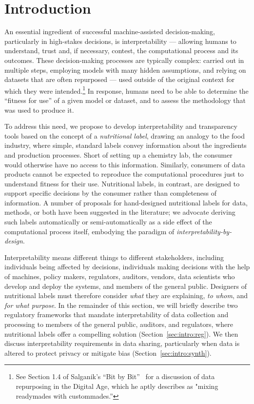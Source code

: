 \section{Introduction}
\label{seC:intro}

An essential ingredient of successful machine-assisted decision-making, particularly in high-stakes decisions, is interpretability --– allowing humans to understand, trust and, if necessary, contest, the computational process and its outcomes.   These decision-making processes are typically complex:  carried out in multiple steps, employing models with many hidden assumptions, and relying on datasets that are often repurposed --- used outside of the original context for which they were intended.\footnote{See Section 1.4 of Salganik's ``Bit by Bit''~\cite{salganik} for a discussion of data repurposing in the Digital Age, which he aptly describes as "mixing readymades with custommades.''}  In response, humans need to be able to determine the ``fitness for use'' of a given model or dataset, and to assess the methodology that was used to produce it.  

To address this need, we propose to develop interpretability and transparency tools based on the concept of a {\em nutritional label}, drawing an analogy to the food industry, where simple, standard labels convey information about the ingredients and production processes. Short of setting up a chemistry lab, the consumer would otherwise have no access to this information. Similarly, consumers of data products cannot be expected to reproduce the computational procedures just to understand fitness for their use.   Nutritional labels, in contrast, are designed to support specific decisions by the consumer rather than completeness of information.  A number of proposals for hand-designed nutritional labels for data, methods, or both have been suggested in the literature\cite{DBLP:journals/corr/abs-1803-09010,DBLP:journals/corr/abs-1805-03677,DBLP:conf/fat/MitchellWZBVHSR19}; we advocate deriving such labels automatically or semi-automatically as a side effect of the computational process itself, embodying the paradigm of {\em interpretability-by-design}. 

Interpretability means different things to different stakeholders, including individuals being affected by decisions, individuals making decisions with the help of machines, policy makers, regulators, auditors, vendors, data scientists who develop and deploy the systems, and members of the general public.  Designers of nutritional labels must therefore consider {\em what} they are explaining,  {\em to whom}, and {\em for what purpose}.  In the remainder of this section, we will briefly describe two regulatory frameworks that mandate interpretability of data collection and processing to members of the general public, auditors, and regulators,  where nutritional labels offer a compelling solution (Section~\ref{sec:intro:reg}).  We then discuss interpretability requirements in data sharing, particularly when data is altered to protect privacy or mitigate bias (Section~\ref{sec:intro:synth}).

